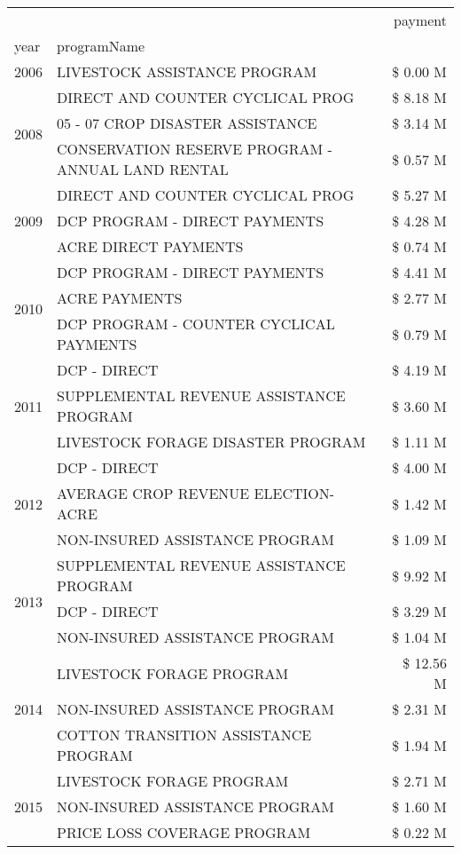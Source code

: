 \begin{tabular}{llr}
\toprule
 &  & payment \\
year & programName &  \\
\midrule
2006 & LIVESTOCK ASSISTANCE PROGRAM & \$ 0.00 M \\
\cline{1-3}
\multirow[t]{3}{*}{2008} & DIRECT AND COUNTER CYCLICAL PROG & \$ 8.18 M \\
 & 05 - 07 CROP DISASTER ASSISTANCE & \$ 3.14 M \\
 & CONSERVATION RESERVE PROGRAM - ANNUAL LAND RENTAL & \$ 0.57 M \\
\cline{1-3}
\multirow[t]{3}{*}{2009} & DIRECT AND COUNTER CYCLICAL PROG & \$ 5.27 M \\
 & DCP PROGRAM - DIRECT PAYMENTS & \$ 4.28 M \\
 & ACRE DIRECT PAYMENTS & \$ 0.74 M \\
\cline{1-3}
\multirow[t]{3}{*}{2010} & DCP PROGRAM - DIRECT PAYMENTS & \$ 4.41 M \\
 & ACRE PAYMENTS & \$ 2.77 M \\
 & DCP PROGRAM - COUNTER CYCLICAL PAYMENTS & \$ 0.79 M \\
\cline{1-3}
\multirow[t]{3}{*}{2011} & DCP - DIRECT & \$ 4.19 M \\
 & SUPPLEMENTAL REVENUE ASSISTANCE PROGRAM & \$ 3.60 M \\
 & LIVESTOCK FORAGE DISASTER PROGRAM & \$ 1.11 M \\
\cline{1-3}
\multirow[t]{3}{*}{2012} & DCP - DIRECT & \$ 4.00 M \\
 & AVERAGE CROP REVENUE ELECTION-ACRE & \$ 1.42 M \\
 & NON-INSURED ASSISTANCE PROGRAM & \$ 1.09 M \\
\cline{1-3}
\multirow[t]{3}{*}{2013} & SUPPLEMENTAL REVENUE ASSISTANCE PROGRAM & \$ 9.92 M \\
 & DCP - DIRECT & \$ 3.29 M \\
 & NON-INSURED ASSISTANCE PROGRAM & \$ 1.04 M \\
\cline{1-3}
\multirow[t]{3}{*}{2014} & LIVESTOCK FORAGE PROGRAM & \$ 12.56 M \\
 & NON-INSURED ASSISTANCE PROGRAM & \$ 2.31 M \\
 & COTTON TRANSITION ASSISTANCE PROGRAM & \$ 1.94 M \\
\cline{1-3}
\multirow[t]{3}{*}{2015} & LIVESTOCK FORAGE PROGRAM & \$ 2.71 M \\
 & NON-INSURED ASSISTANCE PROGRAM & \$ 1.60 M \\
 & PRICE LOSS COVERAGE PROGRAM & \$ 0.22 M \\

\end{tabular}
